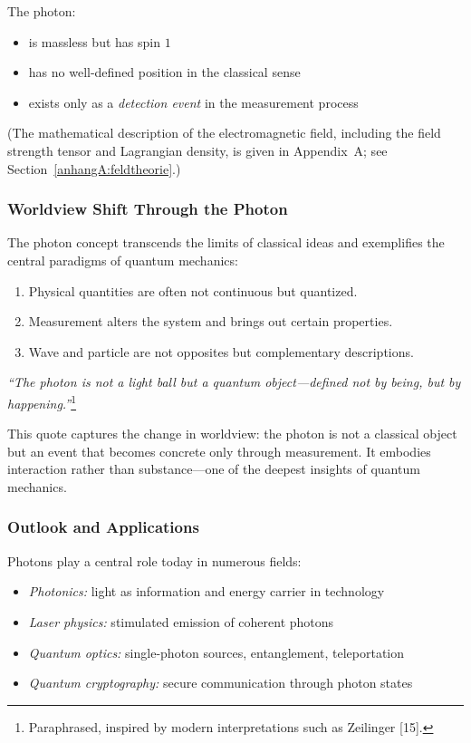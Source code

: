 The photon:
\begin{itemize}
	\item is massless but has spin $1$
	\item has no well-defined position in the classical sense
	\item exists only as a \emph{detection event} in the measurement process
\end{itemize}
(The mathematical description of the electromagnetic field, including the field strength tensor and Lagrangian density, is given in Appendix~A; see Section~\ref{anhangA:feldtheorie}.)

\subsubsection{Worldview Shift Through the Photon}

The photon concept transcends the limits of classical ideas and exemplifies the central paradigms of quantum mechanics:
\begin{enumerate}
	\item Physical quantities are often not continuous but quantized.
	\item Measurement alters the system and brings out certain properties.
	\item Wave and particle are not opposites but complementary descriptions.
\end{enumerate}

\begin{tcolorbox}[didaktikbox, title=Quantum Object Instead of Light Ball]
	\label{box:lichtkugel}
	\emph{“The photon is not a light ball but a quantum object—defined not by being, but by happening.”}\footnote{Paraphrased, inspired by modern interpretations such as Zeilinger [15].}
	
	This quote captures the change in worldview: the photon is not a classical object but an event that becomes concrete only through measurement. It embodies interaction rather than substance—one of the deepest insights of quantum mechanics.
\end{tcolorbox}

\subsubsection{Outlook and Applications}

Photons play a central role today in numerous fields:
\begin{itemize}
	\item \emph{Photonics:} light as information and energy carrier in technology
	\item \emph{Laser physics:} stimulated emission of coherent photons
	\item \emph{Quantum optics:} single-photon sources, entanglement, teleportation
	\item \emph{Quantum cryptography:} secure communication through photon states
\end{itemize}

